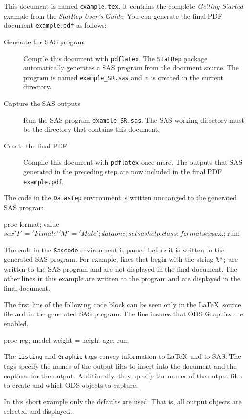 \documentclass{article}
\begin{document}
This document is named \texttt{example.tex}. 
It contains the complete \textit{Getting Started}
example from the \textit{StatRep User's Guide}.
You can generate the final PDF document \texttt{example.pdf} as follows:

\begin{description}
\item[Generate the SAS program]\mbox{}\newline
Compile this document with \texttt{pdflatex}.
The \texttt{StatRep} package automatically generates a SAS program from
the document source. The program is named
\texttt{example\_SR.sas} and it is created in the current directory.

\item[Capture the SAS outputs]\mbox{}\newline
Run the SAS program \texttt{example\_SR.sas}. 
The SAS working directory must be the directory that contains this document.

\item[Create the final PDF]\mbox{}\newline
Compile this document with \texttt{pdflatex} once more. The outputs that SAS generated
in the preceding step are now included in the final PDF \texttt{example.pdf}.
\end{description}

The code in the \texttt{Datastep} environment is written
unchanged to the generated SAS program.

\begin{Datastep}
proc format;
   value $sex 'F' = 'Female' 'M' = 'Male';
data one;
   set sashelp.class;
   format sex $sex.;
run;
\end{Datastep}

  The code in the \texttt{Sascode} environment is parsed before it is
  written to the generated SAS program. For example, lines that begin with the string
  \texttt{\%*;} are written to the SAS program and are not displayed in the 
  final document. The other lines in this example are written to the program 
  and are displayed in the final document.
  
  The first line of the following code block can be seen only
  in the \LaTeX\ source file and in the generated SAS program. 
  The line insures that ODS Graphics are enabled.

\begin{Sascode}[store=class]
proc reg;
    model weight = height age;
run;
\end{Sascode}

  The \texttt{Listing} and \texttt{Graphic} tags convey information to
  \LaTeX\ and to SAS. The tags specify the names of the output files to
  insert into the document and the captions for the output.
  Additionally, they specify the names of the output files to create
  and which ODS objects to capture.



In this short example only the defaults are used. That is, all output
objects are selected and displayed.
\end{document}
